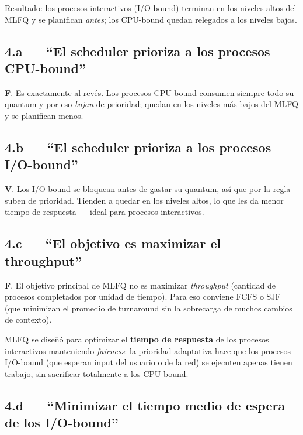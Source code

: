 \documentclass[11pt,a4paper]{article}
\begin{document}
Resultado: los procesos interactivos (I/O-bound) terminan en los
niveles altos del MLFQ y se planifican \emph{antes}; los CPU-bound
quedan relegados a los niveles bajos.

\subsection*{4.a --- ``El scheduler prioriza a los procesos CPU-bound''}

\begin{respuesta}
\textbf{F}. Es exactamente al revés. Los procesos CPU-bound
consumen siempre todo su quantum y por eso \emph{bajan} de prioridad;
quedan en los niveles más bajos del MLFQ y se planifican menos.
\end{respuesta}

\subsection*{4.b --- ``El scheduler prioriza a los procesos I/O-bound''}

\begin{respuesta}
\textbf{V}. Los I/O-bound se bloquean antes de gastar su quantum,
así que por la regla suben de prioridad. Tienden a quedar en los
niveles altos, lo que les da menor tiempo de respuesta --- ideal para
procesos interactivos.
\end{respuesta}

\subsection*{4.c --- ``El objetivo es maximizar el throughput''}

\begin{respuesta}
\textbf{F}. El objetivo principal de MLFQ no es maximizar
\emph{throughput} (cantidad de procesos completados por unidad de
tiempo). Para eso conviene FCFS o SJF (que minimizan el promedio de
turnaround sin la sobrecarga de muchos cambios de contexto).

MLFQ se diseñó para optimizar el \textbf{tiempo de respuesta} de
los procesos interactivos manteniendo \emph{fairness}: la prioridad
adaptativa hace que los procesos I/O-bound (que esperan input del
usuario o de la red) se ejecuten apenas tienen trabajo, sin sacrificar
totalmente a los CPU-bound.
\end{respuesta}

\subsection*{4.d --- ``Minimizar el tiempo medio de espera de los I/O-bound''}
\end{document}
